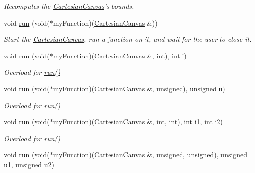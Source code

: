\begin{DoxyCompactItemize}
\begin{DoxyCompactList}\small\item\em Recomputes the \hyperlink{classtsgl_1_1_cartesian_canvas}{Cartesian\-Canvas}'s bounds. \end{DoxyCompactList}\item 
void \hyperlink{classtsgl_1_1_cartesian_canvas_a63a948af53582b713957b872a765dcdb}{run} (void($\ast$my\-Function)(\hyperlink{classtsgl_1_1_cartesian_canvas}{Cartesian\-Canvas} \&))
\begin{DoxyCompactList}\small\item\em Start the \hyperlink{classtsgl_1_1_cartesian_canvas}{Cartesian\-Canvas}, run a function on it, and wait for the user to close it. \end{DoxyCompactList}\item 
void \hyperlink{classtsgl_1_1_cartesian_canvas_a4d50613e241cab83878aa4438f3db67e}{run} (void($\ast$my\-Function)(\hyperlink{classtsgl_1_1_cartesian_canvas}{Cartesian\-Canvas} \&, int), int i)
\begin{DoxyCompactList}\small\item\em Overload for \hyperlink{classtsgl_1_1_cartesian_canvas_a63a948af53582b713957b872a765dcdb}{run()} \end{DoxyCompactList}\item 
void \hyperlink{classtsgl_1_1_cartesian_canvas_ab18eee19a5a0c7011c4442b64d05f6cc}{run} (void($\ast$my\-Function)(\hyperlink{classtsgl_1_1_cartesian_canvas}{Cartesian\-Canvas} \&, unsigned), unsigned u)
\begin{DoxyCompactList}\small\item\em Overload for \hyperlink{classtsgl_1_1_cartesian_canvas_a63a948af53582b713957b872a765dcdb}{run()} \end{DoxyCompactList}\item 
void \hyperlink{classtsgl_1_1_cartesian_canvas_aae4be78e02055eed3e6e85bb39411f21}{run} (void($\ast$my\-Function)(\hyperlink{classtsgl_1_1_cartesian_canvas}{Cartesian\-Canvas} \&, int, int), int i1, int i2)
\begin{DoxyCompactList}\small\item\em Overload for \hyperlink{classtsgl_1_1_cartesian_canvas_a63a948af53582b713957b872a765dcdb}{run()} \end{DoxyCompactList}\item 
void \hyperlink{classtsgl_1_1_cartesian_canvas_a3351ccc624bb154dc910cafd9effe3cd}{run} (void($\ast$my\-Function)(\hyperlink{classtsgl_1_1_cartesian_canvas}{Cartesian\-Canvas} \&, unsigned, unsigned), unsigned u1, unsigned u2)

\end{DoxyCompactItemize}
